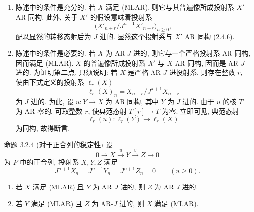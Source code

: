\begin{prooftext}[证明]
\begin{enumerate}[label=(\alph*)]
\item 陈述中的条件是充分的. 若 $X$ 满足 (MLAR), 则它与其普遍像所成投射系 $X'$ AR 同构. 此外, 关于 $X'$ 的假设意味着投射系
\[
\bigl(X'_{n+r}/J^{n+1}X'_{n+r}\bigr)_{n\ge0},
\]
配以显然的转移态射后为 $J$ 进的. 显然这个投射系与 $X'$ AR 同构 (2.4.6).
\item 陈述中的条件是必要的. 若 $X$ 为 AR-$J$ 进的, 则它与一个严格投射系 AR 同构, 因而满足 (MLAR). $X$ 的普遍像所成投射系 $X'$ 与 $X$ AR 同构, 因而是 AR-$J$ 进的. 为证明第二点, 只须说明: 若 $X$ 是严格 AR-$J$ 进投射系, 则存在整数 $r$, 使由下式定义的投射系 $\ell_r(X)$
\[
\ell_r(X)_n=X_{n+r}/J^{n+1}X_{n+r}
\]
为 $J$ 进的. 为此, 设 $u:Y\to X$ 为 AR 同构, 其中 $Y$ 为 $J$ 进的. 由于 $u$ 的核 $T$ 为 AR 零的, 可取整数 $r$, 使典范态射 $T[r]\to T$ 为零. 立即可见, 典范态射
\[
\ell_r(u):\ell_r(Y)\longrightarrow\ell_r(X)
\]
为同构, 故得断言.
\end{enumerate}
\end{prooftext}

\begin{statement}{命题 3.2.4 (对于正合列的稳定性)}
设
\[
0\longrightarrow X\stackrel{u}{\longrightarrow}Y\stackrel{v}{\longrightarrow}Z\longrightarrow0
\]
为 $P$ 中的正合列, 投射系 $X,Y,Z$ 满足
\[
J^{n+1}X_n=J^{n+1}Y_n=J^{n+1}Z_n=0\qquad(n\ge0).
\]
\begin{enumerate}[label=(\roman*)]
\item 若 $X$ 满足 (MLAR) 且 $Y$ 为 AR-$J$ 进的, 则 $Z$ 为 AR-$J$ 进的.
\item 若 $Y$ 满足 (MLAR) 且 $Z$ 为 AR-$J$ 进的, 则 $X$ 满足 (MLAR).
\end{enumerate}
\end{statement}

